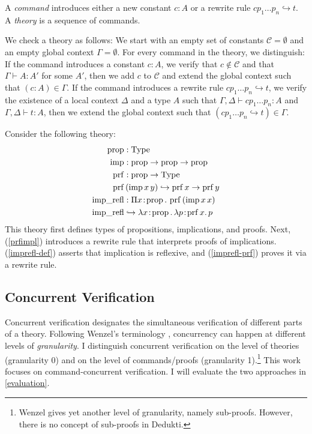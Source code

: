 \documentclass[screen,sigplan,10pt]{acmart}
\begin{document}
A \emph{command} introduces either a new constant \(c: A\) or a rewrite
rule \(c p_1 \dots p_n \hookrightarrow t\). A \emph{theory} is a
sequence of commands.

We check a theory as follows: We start with an empty set of constants
\(\mathcal{C} = \emptyset\) and an empty global context
\(\Gamma = \emptyset\). For every command in the theory, we distinguish:
If the command introduces a constant \(c: A\), we verify that
\(c \notin \mathcal{C}\) and that \(\Gamma \vdash A: A'\) for some
\(A'\), then we add \(c\) to \(\mathcal{C}\) and extend the global
context such that \((c: A) \in \Gamma\). If the command introduces a
rewrite rule \(c p_1 \dots p_n \hookrightarrow t\), we verify the
existence of a local context \(\Delta\) and a type \(A\) such that
\(\Gamma, \Delta \vdash c p_1 \dots p_n : A\) and
\(\Gamma, \Delta \vdash t : A\), then we extend the global context such
that \((c p_1 \dots p_n \hookrightarrow t) \in \Gamma\).

\begin{example}Consider the following theory: \begin{align}
  \operatorname{prop} &: \operatorname{Type} \\
  \operatorname{imp} &: \operatorname{prop} \to \operatorname{prop} \to \operatorname{prop} \\
  \operatorname{prf} &: \operatorname{prop} \to \operatorname{Type} \\
  \operatorname{prf} &\,(\operatorname{imp} x\, y) \hookrightarrow \operatorname{prf} x \to \operatorname{prf} y \label{prfimpl} \\
  \operatorname{imp\_refl} &: \Pi x\!:\!\operatorname{prop}.\, \operatorname{prf}\, (\operatorname{imp} x\, x) \label{imprefl-def} \\
  \operatorname{imp\_refl} &\hookrightarrow \lambda x\!:\!\operatorname{prop}.\, \lambda p\!:\!\operatorname{prf} x.\, p \label{imprefl-prf}
  \end{align} This theory first defines types of propositions,
implications, and proofs. Next, (\ref{prfimpl}) introduces a rewrite
rule that interprets proofs of implications. (\ref{imprefl-def}) asserts
that implication is reflexive, and (\ref{imprefl-prf}) proves it via a
rewrite rule.\end{example}

\hypertarget{cv}{%
\subsection{Concurrent Verification}\label{cv}}

Concurrent verification designates the simultaneous verification of
different parts of a theory. Following Wenzel's terminology
\citep{DBLP:conf/itp/Wenzel13}, concurrency can happen at different
levels of \emph{granularity}. I distinguish concurrent verification on
the level of theories (granularity 0) and on the level of
commands/proofs (granularity 1).\footnote{Wenzel gives yet another level
  of granularity, namely sub-proofs. However, there is no concept of
  sub-proofs in Dedukti.} This work focuses on command-concurrent
verification. I will evaluate the two approaches in
\autoref{evaluation}.
\end{document}
